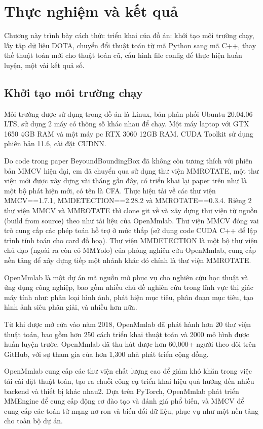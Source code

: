 \documentclass[12pt,a4paper,openany,oneside]{report}
\begin{document}
\chapter{Thực nghiệm và kết quả}

Chương này trình bày cách thức triển khai của đồ án: khởi tạo môi trường chạy, lấy tập dữ liệu DOTA, chuyển đổi thuật toán từ mã Python sang mã C++, thay thế thuật toán mới cho thuật toán cũ, cấu hình file config để thực hiện huấn luyện, một vài kết quả số.
\section{Khởi tạo môi trường chạy} 

Môi trường được sử dụng trong đồ án là Linux, bản phân phối Ubuntu 20.04.06 LTS, sử dụng 2 máy có thông số khác nhau để chạy. Một máy laptop với GTX 1650 4GB RAM và một máy pc RTX 3060 12GB RAM. CUDA Toolkit sử dụng phiên bản 11.6, cài đặt CUDNN.

Do code trong paper BeyoundBoundingBox đã không còn tương thích với phiên bản MMCV \cite{MMCV} hiện đại, em đã chuyển qua sử dụng thư viện MMROTATE, một thư viện mới được xây dựng vài tháng gần đây, có triển khai lại paper trên như là một bộ phát hiện mới, có tên là CFA. Thực hiện tải về các thư viện MMCV==1.7.1, MMDETECTION==2.28.2 và MMROTATE==0.3.4. Riêng 2 thư viện MMCV và MMROTATE \cite{MMRotate} thì clone git về và xây dựng thư viện từ nguồn (build from source) theo như tài liệu của OpenMmlab. Thư viện MMCV đóng vai trò cung cấp các phép toán hỗ trợ ở mức thấp (sử dụng code CUDA C++ để lập trình tính toán cho card đồ hoạ). Thư viện MMDETECTION \cite{MMDetection} là một bộ thư viện chủ đạo (ngoài ra còn có MMYolo) của phòng nghiên cứu OpenMmlab, cung cấp nền tảng để xây dựng tiếp một nhánh khác đó chính là thư viện MMROTATE. 

OpenMmlab là một dự án mã nguồn mở phục vụ cho nghiên cứu học thuật và ứng dụng công nghiệp, bao gồm nhiều chủ đề nghiên cứu trong lĩnh vực thị giác máy tính như: phân loại hình ảnh, phát hiện mục tiêu, phân đoạn mục tiêu, tạo hình ảnh siêu phân giải, và nhiều hơn nữa.

Từ khi được mở cửa vào năm 2018, OpenMmlab đã phát hành hơn 20 thư viện thuật toán, bao gồm hơn 250 cách triển khai thuật toán và 2000 mô hình được huấn luyện trước. OpenMmlab đã thu hút được hơn 60,000+ người theo dõi trên GitHub, với sự tham gia của hơn 1,300 nhà phát triển cộng đồng.

OpenMmlab cung cấp các thư viện chất lượng cao để giảm khó khăn trong việc tái cài đặt thuật toán, tạo ra chuỗi công cụ triển khai hiệu quả hướng đến nhiều backend và thiết bị khác nhau2. Dựa trên PyTorch, OpenMmlab phát triển MMEngine để cung cấp động cơ đào tạo và đánh giá phổ biến, và MMCV để cung cấp các toán tử mạng nơ-ron và biến đổi dữ liệu, phục vụ như một nền tảng cho toàn bộ dự án.
\end{document}

